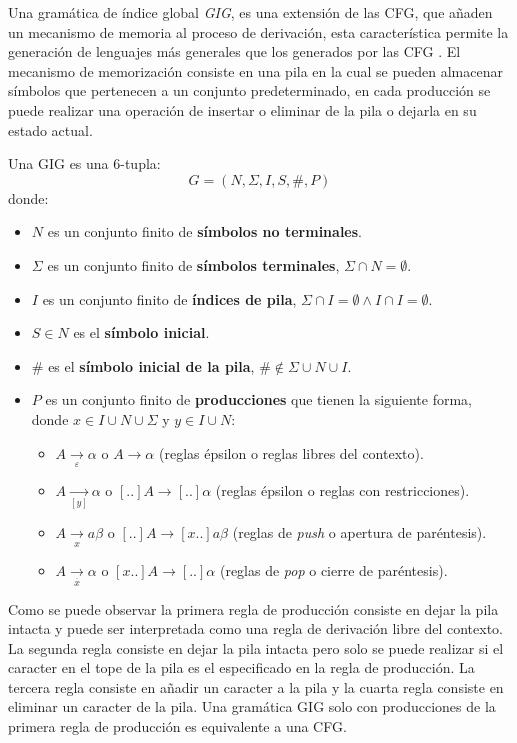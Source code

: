 \documentclass[12pt]{article}
\begin{document}
Una gramática de índice global \textit{GIG}, es una extensión de las CFG, que añaden un mecanismo
de memoria al proceso de derivación, esta característica permite la generación de lenguajes más generales que los generados
por las CFG \cite{globalIndexLanguages}.
El mecanismo de memorización consiste en una pila en la cual se pueden almacenar símbolos que pertenecen a un conjunto predeterminado,
en cada producción se puede realizar una operación de insertar o eliminar de la pila o dejarla en su estado actual.

Una GIG es una 6-tupla:
$$
    G = (N, \Sigma, I, S, \#, P)
$$
donde:

\begin{itemize}
    \item $N$ es un conjunto finito de \textbf{símbolos no terminales}.
    \item \( \Sigma \) es un conjunto finito de \textbf{símbolos terminales}, $\Sigma \cap N=\emptyset$.
    \item $I$ es un conjunto finito de \textbf{índices de pila}, $\Sigma \cap I=\emptyset \wedge I \cap I=\emptyset$.
    \item $S\in N$ es el \textbf{símbolo inicial}.
    \item $\#$ es el \textbf{símbolo inicial de la pila}, $\# \notin \Sigma \cup N \cup I$.
    \item $P$ es un conjunto finito de \textbf{producciones} que tienen la siguiente forma, donde $x\in I\cup N\cup \Sigma$ y $y\in I\cup N$:
          \begin{itemize}
              \item $A \underset{\varepsilon}{\to} \alpha$ o $A \to \alpha$ (reglas épsilon o reglas libres del contexto).
              \item $A \underset{[y]}{\to}  \alpha$ o $[..]A \to [..]\alpha$ (reglas épsilon o reglas con restricciones).
              \item $A \underset{x}{\to} a \beta$ o $[..]A \to  [x..]a\beta$ (reglas de \textit{push} o apertura de paréntesis).
              \item $A \underset{\overline{x}}{\to} \alpha$ o $[x..]A \to [..]\alpha$ (reglas de \textit{pop} o cierre de paréntesis).
          \end{itemize}
\end{itemize}

Como se puede observar la primera regla de producción consiste en dejar la pila intacta y puede ser interpretada como una regla de derivación
libre del contexto. La segunda regla consiste en dejar la pila intacta pero solo se puede realizar si el caracter en el tope de la pila es el
especificado en la regla de producción. La tercera regla consiste en añadir un caracter a la pila y la cuarta regla consiste en eliminar un caracter de la pila.
Una gramática GIG solo con producciones de la primera regla de producción es equivalente a una CFG.
\end{document}
